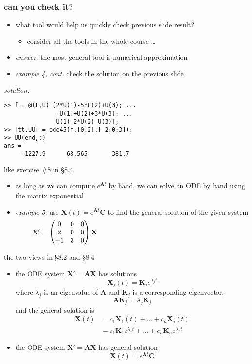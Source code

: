 \documentclass[urlcolor=blue,dvipsnames]{beamer}
\newcommand{\bA}{\mathbf{A}}
\newcommand{\bC}{\mathbf{C}}
\newcommand{\bK}{\mathbf{K}}
\newcommand{\bX}{\mathbf{X}}
\begin{document}
\begin{frame}[fragile]
\frametitle{can you check it?}

\begin{itemize}
\item what tool would help us quickly check previous slide result?
    \begin{itemize}
    \item consider all the tools in the whole course \dots
    \end{itemize}
\item \emph{answer.}  the most general tool is \alert{numerical approximation}

\bigskip
\item \emph{example 4, cont.}  check the solution on the previous slide
\end{itemize}

\noindent \emph{solution.}
\begin{Verbatim}[fontsize=\small]
>> f = @(t,U) [2*U(1)-5*U(2)+U(3); ...
               -U(1)+U(2)+3*U(3); ...
               U(1)-2*U(2)-U(3)];
>> [tt,UU] = ode45(f,[0,2],[-2;0;3]);
>> UU(end,:)
ans =
     -1227.9      68.565      -381.7
\end{Verbatim}
\end{frame}


\begin{frame}{like exercise \#8 in \S8.4}

\begin{itemize}
\item as long as we can compute $e^{\bA t}$ by hand, we can solve an ODE by hand using the matrix exponential
\item \emph{example 5}.  use $\bX(t)=e^{\bA t}\bC$ to find the general solution of the given system
    $$\bX' = \begin{pmatrix} 0 & 0 & 0 \\ 2 & 0 & 0 \\ -1 & 3 & 0 \end{pmatrix} \bX    \hspace{70mm}$$
\end{itemize}

\vspace{40mm}
\end{frame}


\begin{frame}{the two views in \S8.2 and \S8.4}

\begin{itemize}
\item[\S 8.2:] the ODE system $\bX' = \bA \bX$ has solutions
    $$\bX_j(t) = \bK_j e^{\lambda_j t}$$
where $\lambda_j$ is an eigenvalue of $\bA$ and $\bK_j$ is a corresponding eigenvector,
    $$\bA\bK_j=\lambda_j \bK_j$$
and the general solution is
\begin{align*}
\bX(t) &= c_1 \bX_1(t) + \dots + c_n \bX_j(t) \\
       &= c_1 \bK_1 e^{\lambda_1 t} + \dots + c_n \bK_n e^{\lambda_n t}
\end{align*}
\item[\S 8.4:] the ODE system $\bX' = \bA \bX$ has general solution
    $$\bX(t) = e^{\bA t}\bC$$
\end{itemize}
\end{frame}
\end{document}
